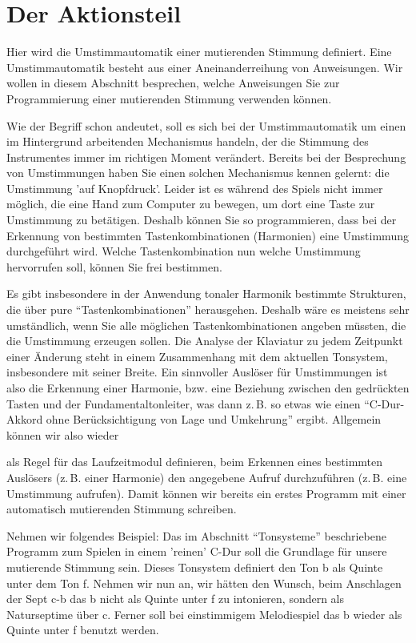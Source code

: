 \section{Der Aktionsteil}\label{sec:der-aktionsteil}\label{sec:der-aktionsteil-1}
Hier wird die Umstimmautomatik einer mutierenden Stimmung
definiert. Eine Umstimmautomatik besteht aus einer
Aneinanderreihung von Anweisungen. Wir wollen in diesem Abschnitt
besprechen, welche Anweisungen Sie zur Programmierung einer
mutierenden Stimmung verwenden können.

Wie der Begriff schon andeutet, soll es sich bei der
Umstimmautomatik um einen im Hintergrund arbeitenden Mechanismus
handeln, der die Stimmung des Instrumentes immer im richtigen
Moment verändert. Bereits bei der Besprechung von Umstimmungen
haben Sie einen solchen Mechanismus kennen gelernt: die Umstimmung
'auf Knopfdruck'. Leider ist es während des Spiels nicht immer
möglich, die eine Hand zum Computer zu bewegen, um dort eine Taste
zur Umstimmung zu betätigen. Deshalb können Sie
\mutabor{} so programmieren, dass bei der Erkennung
von bestimmten Tastenkombinationen (Harmonien) eine Umstimmung
durchgeführt wird. Welche Tastenkombination nun welche Umstimmung
hervorrufen soll, können Sie frei bestimmen.

Es gibt insbesondere in der Anwendung tonaler Harmonik bestimmte
Strukturen, die über pure "`Tastenkombinationen"' herausgehen.
Deshalb wäre es meistens sehr umständlich, wenn Sie alle möglichen
Tastenkombinationen angeben müssten, die die Umstimmung erzeugen
sollen. Die Analyse der Klaviatur zu jedem Zeitpunkt einer Änderung
steht in einem Zusammenhang mit dem aktuellen Tonsystem, insbesondere
mit seiner Breite. Ein sinnvoller Auslöser für Umstimmungen ist also
die Erkennung einer Harmonie, bzw. eine Beziehung zwischen den
gedrückten Tasten und der Fundamentaltonleiter, was dann z.\,B. so etwas
wie einen "`C-Dur-Akkord ohne Berücksichtigung von Lage und
Umkehrung"' ergibt.  Allgemein können wir also wieder


als Regel für das Laufzeitmodul definieren, beim Erkennen eines
bestimmten Auslösers (z.\,B. einer Harmonie) den angegebene Aufruf
durchzuführen (z.\,B. eine Umstimmung aufrufen). Damit können wir
bereits ein erstes Programm mit einer automatisch mutierenden
Stimmung schreiben.

Nehmen wir folgendes Beispiel:
Das im Abschnitt "`Tonsysteme"' beschriebene Programm zum Spielen in
einem 'reinen' C-Dur soll die Grundlage für unsere mutierende
Stimmung sein. Dieses Tonsystem definiert den Ton b als Quinte
unter dem Ton f. Nehmen wir nun an, wir hätten den Wunsch, beim
Anschlagen der Sept c-b das b nicht als Quinte unter f zu
intonieren, sondern als Naturseptime über c. Ferner soll bei
einstimmigem Melodiespiel das b wieder als Quinte unter f benutzt
werden.

